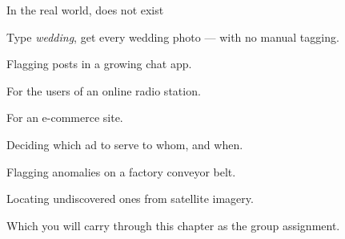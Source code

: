 \documentclass[aspectratio=169,11pt,t]{beamer}
\begin{document}
\begin{frame}[shrink=25]{In the real world,  does not exist}
\begin{minipage}[t]{0.241\textwidth}
\begin{icard}
Type \textit{wedding}, get every wedding photo --- with no manual tagging.
\end{icard}
\end{minipage}%
\hfill
\begin{minipage}[t]{0.241\textwidth}
\begin{icard}
Flagging posts in a growing chat app.
\end{icard}
\end{minipage}%
\hfill
\begin{minipage}[t]{0.241\textwidth}
\begin{icard}
For the users of an online radio station.
\end{icard}
\end{minipage}%
\hfill
\begin{minipage}[t]{0.241\textwidth}
\begin{icard}
For an e-commerce site.
\end{icard}
\end{minipage}%


\vskip 4pt

\begin{minipage}[t]{0.241\textwidth}
\begin{icard}
Deciding which ad to serve to whom, and when.
\end{icard}
\end{minipage}%
\hfill
\begin{minipage}[t]{0.241\textwidth}
\begin{icard}
Flagging anomalies on a factory conveyor belt.
\end{icard}
\end{minipage}%
\hfill
\begin{minipage}[t]{0.241\textwidth}
\begin{icard}
Locating undiscovered ones from satellite imagery.
\end{icard}
\end{minipage}%
\hfill
\begin{minipage}[t]{0.241\textwidth}
\begin{icardaccent}
Which you will carry through this chapter as the group assignment.
\end{icardaccent}
\end{minipage}%
\end{frame}
\end{document}

